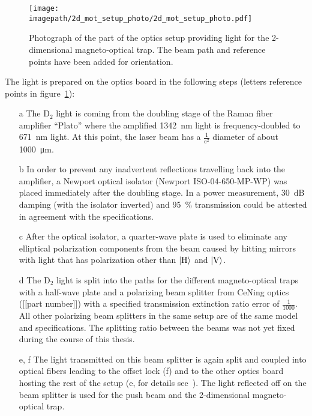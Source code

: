 \begin{figure}
    \centering
    \texttt{[image: \\imagepath/2d\_mot\_setup\_photo/2d\_mot\_setup\_photo.pdf]}
    \caption{Photograph of the part of the optics setup providing light for the 2-dimensional magneto-optical trap. The beam path and reference points have been added for orientation.}\label{fig:2d_mot_setup_photo}
\end{figure}

The light is prepared on the optics board in the following steps (letters reference points in figure~\ref{fig:2d_mot_setup_photo}):
\begin{itemize}
    \item[a] The D$_2$ light is coming from the doubling stage of the Raman fiber amplifier ``Plato'' where the amplified \SI{1342}{\nano\meter} light is frequency-doubled to \SI{671}{\nano\meter} light. At this point, the laser beam has a $\frac{1}{\text{e}^2}$ diameter of about \SI{1000}{\micro\meter}.

    \item[b] In order to prevent any inadvertent reflections travelling back into the amplifier, a Newport optical isolator (Newport ISO-04-650-MP-WP) was placed immediately after the doubling stage. In a power measurement, \SI{30}{\deci\bel} damping (with the isolator inverted) and \SI{95}{\percent} transmission could be attested in agreement with the specifications.

    \item[c] After the optical isolator, a quarter-wave plate is used to eliminate any elliptical polarization components from the beam caused by hitting mirrors with light that has polarization other than $\Ket{\text{H}}$ and $\Ket{\text{V}}$.

    \item[d] The D$_2$ light is split into the paths for the different magneto-optical traps with a half-wave plate and a polarizing beam splitter from CeNing optics ([[part number]]) with a specified transmission extinction ratio error of $\frac{1}{1000}$. All other polarizing beam splitters in the same setup are of the same model and specifications. The splitting ratio between the beams was not yet fixed during the course of this thesis.

    \item[e, f] The light transmitted on this beam splitter is again split and coupled into optical fibers leading to the offset lock (f) and to the other optics board hosting the rest of the setup (e, for details see~\cite{qesja_design_2022}). The light reflected off on the beam splitter is used for the push beam and the 2-dimensional magneto-optical trap.


\end{itemize}

